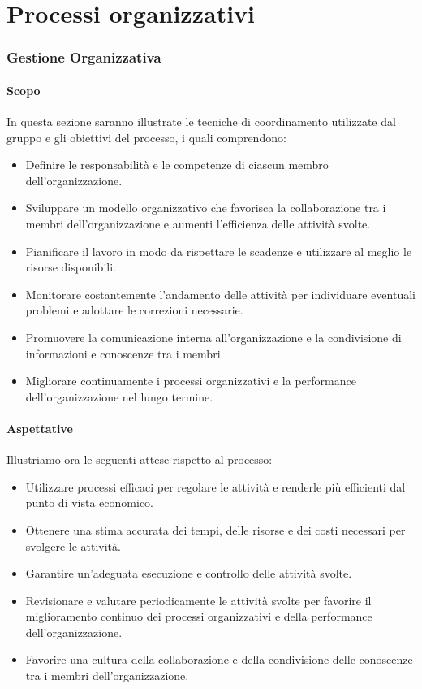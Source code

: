 \chapter{Processi organizzativi}

\subsection{Gestione Organizzativa}

\subsubsection{Scopo}

In questa sezione saranno illustrate le tecniche di coordinamento utilizzate dal gruppo e gli obiettivi del processo, i quali comprendono:

\begin{itemize}
\item Definire le responsabilità e le competenze di ciascun membro dell'organizzazione.
\item Sviluppare un modello organizzativo che favorisca la collaborazione tra i membri dell'organizzazione e aumenti l'efficienza delle attività svolte.
\item Pianificare il lavoro in modo da rispettare le scadenze e utilizzare al meglio le risorse disponibili.
\item Monitorare costantemente l'andamento delle attività per individuare eventuali problemi e adottare le correzioni necessarie.
\item Promuovere la comunicazione interna all'organizzazione e la condivisione di informazioni e conoscenze tra i membri.
\item Migliorare continuamente i processi organizzativi e la performance dell'organizzazione nel lungo termine.
\end{itemize}

\subsubsection{Aspettative}

Illustriamo ora le seguenti attese rispetto al processo:

\begin{itemize}
\item Utilizzare processi efficaci per regolare le attività e renderle più efficienti dal punto di vista economico.
\item Ottenere una stima accurata dei tempi, delle risorse e dei costi necessari per svolgere le attività.
\item Garantire un'adeguata esecuzione e controllo delle attività svolte.
\item Revisionare e valutare periodicamente le attività svolte per favorire il miglioramento continuo dei processi organizzativi e della performance dell'organizzazione.
\item Favorire una cultura della collaborazione e della condivisione delle conoscenze tra i membri dell'organizzazione.
\end{itemize}

